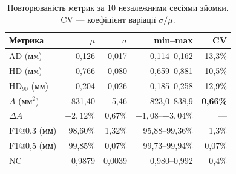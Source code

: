 \begin{table}[!t]
\centering
\small
\setlength{\tabcolsep}{12pt}
\begin{tabular}{lrrrr}
\toprule
Метрика & $\mu$ & $\sigma$ & min--max & CV \\
\midrule
\rowcolor{blue!6} AD (мм)        & 0,126   & 0,017   & 0,114--0,162  & 13,3\% \\
HD (мм)        & 0,766   & 0,080   & 0,659--0,881  & 10,5\% \\
\rowcolor{blue!6} HD$_{90}$ (мм) & 0,204   & 0,026   & 0,185--0,258  & 12,9\% \\
$A$ (мм$^2$)   & 831,40  & 5,46    & 823,0--838,9  & \textbf{0,66\%} \\
\rowcolor{blue!6} $\Delta A$     & $+2,12$\% & 0,67\% & $+1,08$--$+3,04$\% & --- \\
F1@0,3 (мм)    & 98,60\% & 1,32\%  & 95,88--99,36\% & 1,3\% \\
\rowcolor{blue!6} F1@0,5 (мм)    & 99,85\% & 0,07\%  & 99,73--99,94\% & 0,07\% \\
NC             & 0,9879  & 0,0039  & 0,980--0,992  & 0,4\% \\
\bottomrule
\end{tabular}
\caption{Повторюваність метрик за 10 незалежними сесіями зйомки. CV --- коефіцієнт варіації $\sigma / \mu$.}
\label{tbl-precision}
\end{table}

